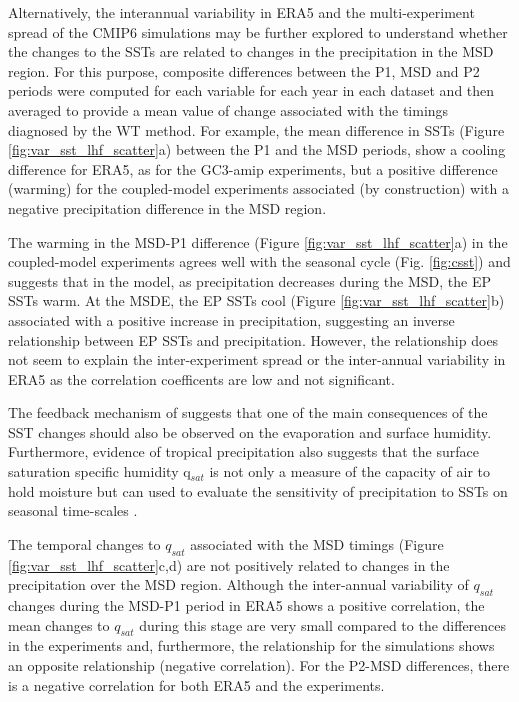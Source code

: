 Alternatively, the interannual variability in ERA5 and the multi-experiment spread of the CMIP6 simulations may be further explored to understand whether the changes to the SSTs are related to changes in the precipitation in the MSD region. For this purpose, composite differences between the P1, MSD and P2 periods were computed for each variable for each year in each dataset and then averaged to provide a mean value of change associated with the timings diagnosed by the WT method.  For example, the mean difference in SSTs (Figure \ref{fig:var_sst_lhf_scatter}a) between the P1 and the MSD periods, show a cooling difference for ERA5, as for the GC3-amip experiments, but a positive difference (warming) for the coupled-model experiments associated (by construction) with a negative precipitation difference in the MSD region. 

The warming in the MSD-P1 difference (Figure \ref{fig:var_sst_lhf_scatter}a) in the coupled-model experiments agrees well with the seasonal cycle (Fig. \ref{fig:csst}) and suggests that in the model, as precipitation decreases during the MSD, the EP SSTs warm. At the MSDE, the EP SSTs cool (Figure \ref{fig:var_sst_lhf_scatter}b) associated with a positive increase in precipitation, suggesting an inverse relationship between EP SSTs and precipitation. However, the relationship does not seem to explain the inter-experiment spread or the inter-annual variability in ERA5 as the correlation coefficents are low and not significant. 

The feedback mechanism of \cite{magana1999} suggests that one of the main consequences of the SST changes should also be observed on the evaporation and surface humidity. Furthermore, evidence of tropical precipitation also suggests that the surface saturation specific humidity q$_{sat}$ is not only a measure of the capacity of air to hold moisture but can used to evaluate the sensitivity of precipitation to SSTs on seasonal time-scales \citep{yang2019,good2021}.

The temporal changes to $q_{sat}$ associated with the MSD timings (Figure \ref{fig:var_sst_lhf_scatter}c,d) are not positively related to changes in the precipitation over the MSD region. Although the inter-annual variability of $q_{sat}$ changes during the MSD-P1  period in ERA5 shows a positive correlation, the mean changes to $q_{sat}$ during this stage are very small compared to the differences in the experiments and, furthermore, the relationship for the simulations shows an opposite relationship (negative correlation). For the P2-MSD differences, there is a negative correlation for both ERA5 and the experiments. 

